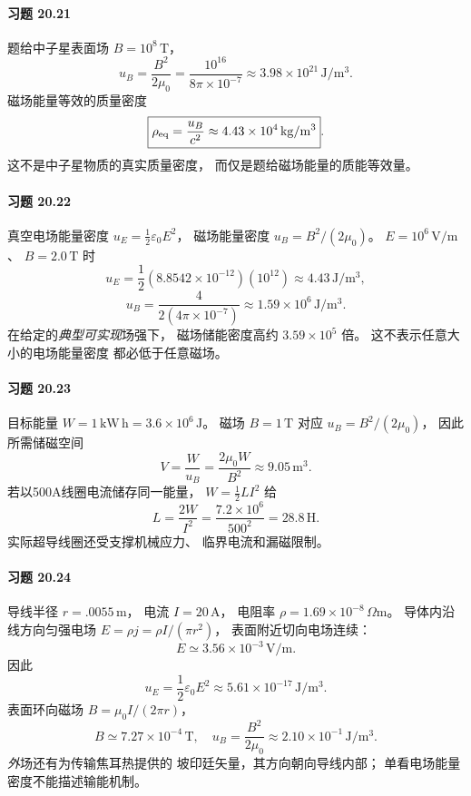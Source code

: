 \paragraph{习题 20.21}
题给中子星表面场
\(B=10^8\,\mathrm T\)，
\[
 \boxed{u_B=\frac{B^2}{2\mu_0}
 =\frac{10^{16}}{8\pi\times10^{-7}}
 \approx3.98\times10^{21}\,\mathrm{J/m^3}}.
\]
磁场能量等效的质量密度
\[
 \boxed{\rho_{\rm eq}=\frac{u_B}{c^2}
 \approx4.43\times10^4\,\mathrm{kg/m^3}}.
\]
这不是中子星物质的真实质量密度，
而仅是题给磁场能量的质能等效量。

\paragraph{习题 20.22}
真空电场能量密度
\(u_E=\tfrac12\varepsilon_0E^2\)，
磁场能量密度
\(u_B=B^2/(2\mu_0)\)。
\(E=10^6\,\mathrm{V/m}\)、
\(B=2.0\,\mathrm T\) 时
\[
 \boxed{u_E
 =\frac12(8.8542\times10^{-12})(10^{12})
 \approx4.43\,\mathrm{J/m^3}},
\]
\[
 \boxed{u_B=\frac4{2(4\pi\times10^{-7})}
 \approx1.59\times10^6\,\mathrm{J/m^3}}.
\]
在给定的\emph{典型可实现}场强下，
磁场储能密度高约
\(\boxed{3.59\times10^5}\) 倍。
这不表示任意大小的电场能量密度
都必低于任意磁场。

\paragraph{习题 20.23}
目标能量
\(W=1\,\mathrm{kW\,h}
 =3.6\times10^6\,\mathrm J\)。
磁场 \(B=1\,\mathrm T\)
对应 \(u_B=B^2/(2\mu_0)\)，
因此所需储磁空间
\[
 \boxed{V=\frac{W}{u_B}
 =\frac{2\mu_0W}{B^2}
 \approx9.05\,\mathrm{m^3}}.
\]
若以500A线圈电流储存同一能量，
\(W=\frac12LI^2\) 给
\[
 \boxed{L=\frac{2W}{I^2}
 =\frac{7.2\times10^6}{500^2}
 =28.8\,\mathrm H}.
\]
实际超导线圈还受支撑机械应力、
临界电流和漏磁限制。

\paragraph{习题 20.24}
导线半径
\(r=.0055\,\mathrm m\)，
电流 \(I=20\,\mathrm A\)，
电阻率
\(\rho=1.69\times10^{-8}\,\Omega\mathrm m\)。
导体内沿线方向匀强电场
\(E=\rho j=\rho I/(\pi r^2)\)，
表面附近切向电场连续：
\[
 \boxed{E\simeq3.56\times10^{-3}\,\mathrm{V/m}}.
\]
因此
\[
 \boxed{u_E=\frac12\varepsilon_0E^2
 \approx5.61\times10^{-17}\,\mathrm{J/m^3}}.
\]
表面环向磁场
\(B=\mu_0I/(2\pi r)\)，
\[
 \boxed{B\simeq7.27\times10^{-4}\,\mathrm T},\quad
 \boxed{u_B=\frac{B^2}{2\mu_0}
 \approx2.10\times10^{-1}\,\mathrm{J/m^3}}.
\]
\emph{外}场还有为传输焦耳热提供的
坡印廷矢量，其方向朝向导线内部；
单看电场能量密度不能描述输能机制。

